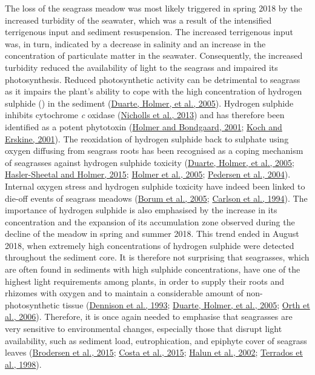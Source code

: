 \documentclass[
  12 pt,
]{book}
\begin{document}
The loss of the seagrass meadow was most likely triggered in spring 2018 by the increased turbidity of the seawater, which was a result of the intensified terrigenous input and sediment resuspension. The increased terrigenous input was, in turn, indicated by a decrease in salinity and an increase in the concentration of particulate matter in the seawater. Consequently, the increased turbidity reduced the availability of light to the seagrass and impaired its photosynthesis. Reduced photosynthetic activity can be detrimental to seagrass as it impairs the plant's ability to cope with the high concentration of hydrogen sulphide () in the sediment (\protect\hyperlink{ref-Duarte2005}{Duarte, Holmer, et al., 2005}). Hydrogen sulphide inhibits cytochrome \emph{c} oxidase (\protect\hyperlink{ref-Nicholls2013}{Nicholls et al., 2013}) and has therefore been identified as a potent phytotoxin (\protect\hyperlink{ref-Holmer2001a}{Holmer and Bondgaard, 2001}; \protect\hyperlink{ref-Koch2001}{Koch and Erskine, 2001}). The reoxidation of hydrogen sulphide back to sulphate using oxygen diffusing from seagrass roots has been recognised as a coping mechanism of seagrasses against hydrogen sulphide toxicity (\protect\hyperlink{ref-Duarte2005}{Duarte, Holmer, et al., 2005}; \protect\hyperlink{ref-Hasler-Sheetal2015}{Hasler-Sheetal and Holmer, 2015}; \protect\hyperlink{ref-Holmer2005}{Holmer et al., 2005}; \protect\hyperlink{ref-Pedersen2004}{Pedersen et al., 2004}). Internal oxygen stress and hydrogen sulphide toxicity have indeed been linked to die-off events of seagrass meadows (\protect\hyperlink{ref-Borum2005}{Borum et al., 2005}; \protect\hyperlink{ref-Carlson1994}{Carlson et al., 1994}). The importance of hydrogen sulphide is also emphasised by the increase in its concentration and the expansion of its accumulation zone observed during the decline of the meadow in spring and summer 2018. This trend ended in August 2018, when extremely high concentrations of hydrogen sulphide were detected throughout the sediment core. It is therefore not surprising that seagrasses, which are often found in sediments with high sulphide concentrations, have one of the highest light requirements among plants, in order to supply their roots and rhizomes with oxygen and to maintain a considerable amount of non-photosynthetic tissue (\protect\hyperlink{ref-Dennison1993}{Dennison et al., 1993}; \protect\hyperlink{ref-Duarte2005}{Duarte, Holmer, et al., 2005}; \protect\hyperlink{ref-Orth2006}{Orth et al., 2006}). Therefore, it is once again needed to emphasise that seagrasses are very sensitive to environmental changes, especially those that disrupt light availability, such as sediment load, eutrophication, and epiphyte cover of seagrass leaves (\protect\hyperlink{ref-Brodersen2015}{Brodersen et al., 2015}; \protect\hyperlink{ref-Costa2015}{Costa et al., 2015}; \protect\hyperlink{ref-Halun2002}{Halun et al., 2002}; \protect\hyperlink{ref-Terrados1998}{Terrados et al., 1998}).
\end{document}
